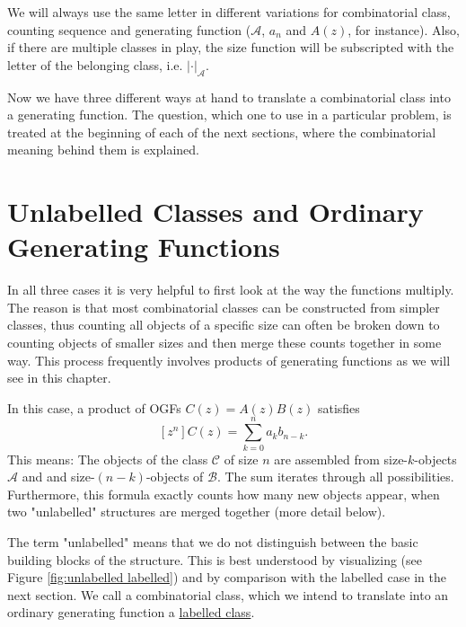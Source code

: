 We will always use the same letter in different variations for combinatorial class, counting sequence and generating function ($\mathcal{A}$, $a_n$ and $A(z)$, for instance). 
Also, if there are multiple classes in play, the size function will be subscripted with the letter of the belonging class, i.e. $|\cdot|_\mathcal{A}$. 

Now we have three different ways at hand to translate a combinatorial class into a generating function. 
The question, which one to use in a particular problem, is treated at the beginning of each of the next sections, where the combinatorial meaning behind them is explained.









\section{Unlabelled Classes and Ordinary Generating Functions}

In all three cases it is very helpful to first look at the way the functions multiply. 
The reason is that most combinatorial classes can be constructed from simpler classes, thus counting all objects of a specific size can often be broken down to counting objects of smaller sizes and then merge these counts together in some way. 
This process frequently involves products of generating functions as we will see in this chapter.

In this case, a product of OGFs $C(z) = A(z) B(z)$ satisfies
\begin{equation}
\label{eq:ogf mult}
    [z^n] C(z) = \sum_{k=0}^n a_k b_{n-k}.
\end{equation}
This means: The objects of the class $\mathcal{C}$ of size $n$ are assembled from size-$k$-objects $\mathcal{A}$ and and size-$(n-k)$-objects of $\mathcal{B}$. 
The sum iterates through all possibilities. 
Furthermore, this formula exactly counts how many new objects appear, when two "unlabelled" structures are merged together (more detail below). 

The term "unlabelled" means that we do not distinguish between the basic building blocks of the structure. 
This is best understood by visualizing (see Figure \ref{fig:unlabelled labelled}) and by comparison with the labelled case in the next section.
We call a combinatorial class, which we intend to translate into an ordinary generating function a \ul{labelled class}.

